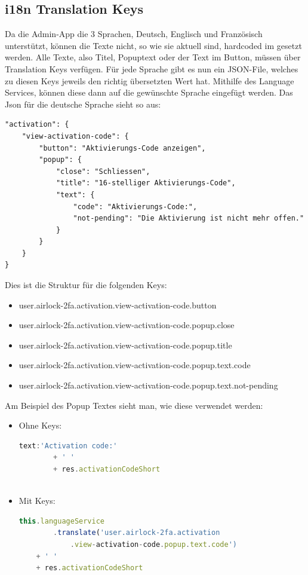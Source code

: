 \subsection{i18n Translation Keys}
Da die Admin-App die 3 Sprachen, Deutsch, Englisch und Französisch unterstützt, können die Texte nicht, so wie sie aktuell sind, hardcoded im gesetzt werden. Alle Texte, also Titel, Popuptext oder der Text im Button, müssen über Translation Keys verfügen. Für jede Sprache gibt es nun ein JSON-File, welches zu diesen Keys jeweils den richtig übersetzten Wert hat. Mithilfe des Language Services, können diese dann auf die gewünschte Sprache eingefügt werden. Das Json für die deutsche Sprache sieht so aus:
\begin{verbatim}
"activation": {
	"view-activation-code": {
		"button": "Aktivierungs-Code anzeigen",
		"popup": {
			"close": "Schliessen",
			"title": "16-stelliger Aktivierungs-Code",
			"text": {
				"code": "Aktivierungs-Code:",
				"not-pending": "Die Aktivierung ist nicht mehr offen."
			}
		}
	}
}
\end{verbatim}
Dies ist die Struktur für die folgenden Keys:
\begin{itemize}
	\item user.airlock-2fa.activation.view-activation-code.button
	\item user.airlock-2fa.activation.view-activation-code.popup.close
	\item user.airlock-2fa.activation.view-activation-code.popup.title
	\item user.airlock-2fa.activation.view-activation-code.popup.text.code
	\item user.airlock-2fa.activation.view-activation-code.popup.text.not-pending
\end{itemize}
Am Beispiel des Popup Textes sieht man, wie diese verwendet werden:
\begin{itemize}
	\item Ohne Keys:
	\begin{lstlisting}[language=TypeScript]
	text:'Activation code:'
		+ ' '
		+ res.activationCodeShort
		
	\end{lstlisting}
	\item Mit Keys:
	\begin{lstlisting}[language=TypeScript]
   	this.languageService
        .translate('user.airlock-2fa.activation
        	.view-activation-code.popup.text.code')
	+ ' '
	+ res.activationCodeShort
	\end{lstlisting}	
\end{itemize}
